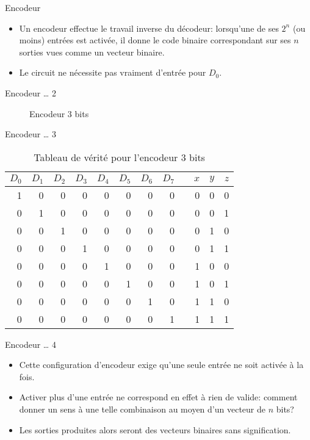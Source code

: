 \documentclass[presentation]{beamer}
\begin{document}
\begin{frame}[label={sec:orgff8dc78}]{Encodeur}
\begin{itemize}
\item Un encodeur effectue le travail inverse du décodeur: lorsqu'une de ses \(2^n\) (ou moins) entrées est activée, il donne le code binaire correspondant sur ses \(n\) sorties vues comme un vecteur binaire.

\item Le circuit ne nécessite pas vraiment d'entrée pour \(D_0\).
\end{itemize}
\end{frame}

\begin{frame}[label={sec:org3a5ec7a}]{Encodeur \ldots{} 2}
\begin{figure}[htbp]
\centering

\caption{\label{fig:org48e3eb8}Encodeur 3 bits}
\end{figure}
\end{frame}

\begin{frame}[label={sec:orge8babd1}]{Encodeur \ldots{} 3}
\begin{table}[htbp]
\caption{\label{tab:org697bb95}Tableau de vérité pour l'encodeur 3 bits}
\centering
\begin{tabular}{rrrrrrrrlrrr}
\(D_0\) & \(D_1\) & \(D_2\) & \(D_3\) & \(D_4\) & \(D_5\) & \(D_6\) & \(D_7\) &  & \(x\) & \(y\) & \(z\)\\
\hline
1 & 0 & 0 & 0 & 0 & 0 & 0 & 0 &  & 0 & 0 & 0\\
0 & 1 & 0 & 0 & 0 & 0 & 0 & 0 &  & 0 & 0 & 1\\
0 & 0 & 1 & 0 & 0 & 0 & 0 & 0 &  & 0 & 1 & 0\\
0 & 0 & 0 & 1 & 0 & 0 & 0 & 0 &  & 0 & 1 & 1\\
0 & 0 & 0 & 0 & 1 & 0 & 0 & 0 &  & 1 & 0 & 0\\
0 & 0 & 0 & 0 & 0 & 1 & 0 & 0 &  & 1 & 0 & 1\\
0 & 0 & 0 & 0 & 0 & 0 & 1 & 0 &  & 1 & 1 & 0\\
0 & 0 & 0 & 0 & 0 & 0 & 0 & 1 &  & 1 & 1 & 1\\
\end{tabular}
\end{table}
\end{frame}

\begin{frame}[label={sec:orge5ce853}]{Encodeur \ldots{} 4}
\begin{itemize}
\item Cette configuration d'encodeur exige qu'une seule entrée ne soit activée à la fois.

\item Activer plus d'une entrée ne correspond en effet à rien de valide: comment donner un sens à une telle combinaison au moyen d'un vecteur de \(n\) bits?

\item Les sorties produites alors seront des vecteurs binaires sans signification.
\end{itemize}
\end{frame}
\end{document}
